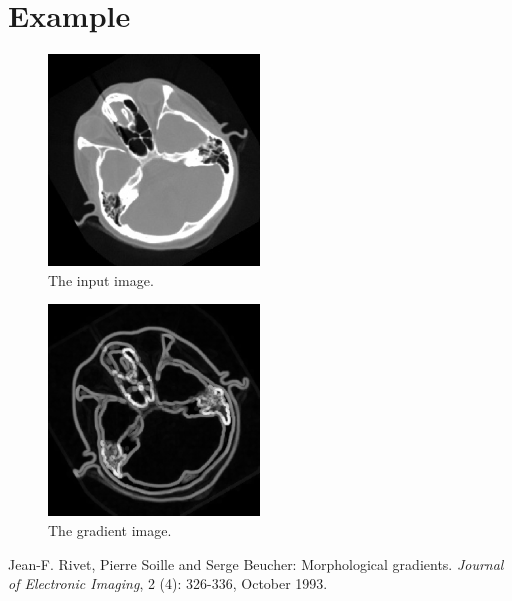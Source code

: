 \documentclass[IJ]{cesj}
\begin{document}
\section{Example}
\begin{figure}[hb]
\centering
\includegraphics[width=0.5\textwidth]{cthead1.eps}
\caption{The input image.}
\end{figure}

\begin{figure}[hb]
\centering
\includegraphics[width=0.5\textwidth]{gradient.eps}
\caption{The gradient image.}
\end{figure}

\begin{thebibliography}{n}
 Jean-F. Rivet, Pierre Soille and Serge Beucher: Morphological gradients. \emph{Journal of Electronic Imaging}, 2 (4): 326-336, October 1993.
\end{thebibliography}
\end{document}
